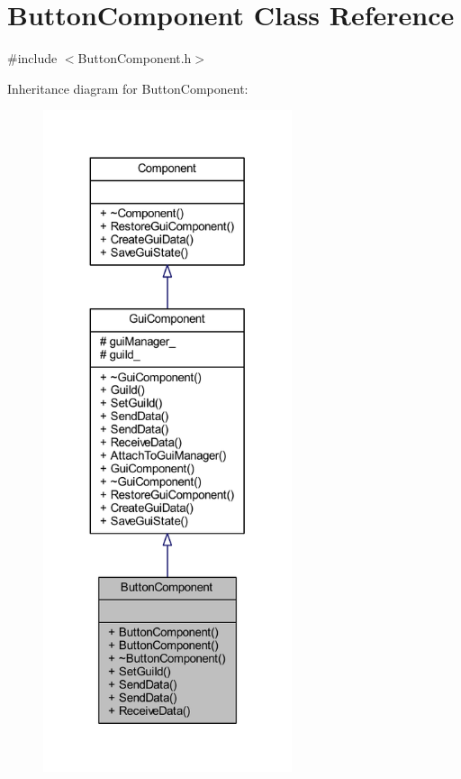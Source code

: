 \hypertarget{class_button_component}{}\section{Button\+Component Class Reference}
\label{class_button_component}


{\ttfamily \#include $<$Button\+Component.\+h$>$}



Inheritance diagram for Button\+Component\+:
\nopagebreak
\begin{figure}[H]
\begin{center}
\leavevmode
\includegraphics[height=550pt]{class_button_component__inherit__graph}
\end{center}
\end{figure}


